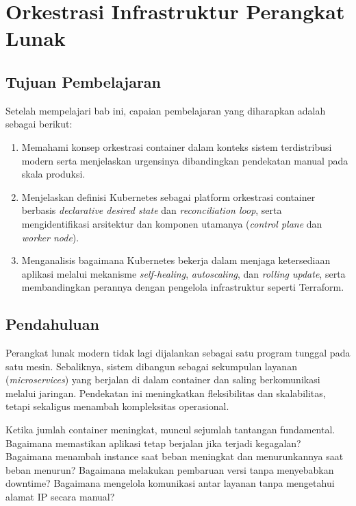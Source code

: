 \chapter{Orkestrasi Infrastruktur Perangkat Lunak}

\section*{Tujuan Pembelajaran}

Setelah mempelajari bab ini, capaian pembelajaran yang diharapkan adalah sebagai berikut:

\begin{enumerate}
    \item Memahami konsep orkestrasi container dalam konteks sistem terdistribusi modern serta menjelaskan urgensinya dibandingkan pendekatan manual pada skala produksi.

    \item Menjelaskan definisi Kubernetes sebagai platform orkestrasi container berbasis \textit{declarative desired state} dan \textit{reconciliation loop}, serta mengidentifikasi arsitektur dan komponen utamanya (\textit{control plane} dan \textit{worker node}).

    \item Menganalisis bagaimana Kubernetes bekerja dalam menjaga ketersediaan aplikasi melalui mekanisme \textit{self-healing}, \textit{autoscaling}, dan \textit{rolling update}, serta membandingkan perannya dengan pengelola infrastruktur seperti Terraform.
\end{enumerate}
\section{Pendahuluan}

Perangkat lunak modern tidak lagi dijalankan sebagai satu program tunggal pada satu mesin. 
Sebaliknya, sistem dibangun sebagai sekumpulan layanan (\textit{microservices}) yang berjalan di dalam container dan saling berkomunikasi melalui jaringan. 
Pendekatan ini meningkatkan fleksibilitas dan skalabilitas, tetapi sekaligus menambah kompleksitas operasional.

Ketika jumlah container meningkat, muncul sejumlah tantangan fundamental. 
Bagaimana memastikan aplikasi tetap berjalan jika terjadi kegagalan? 
Bagaimana menambah instance saat beban meningkat dan menurunkannya saat beban menurun? 
Bagaimana melakukan pembaruan versi tanpa menyebabkan downtime? 
Bagaimana mengelola komunikasi antar layanan tanpa mengetahui alamat IP secara manual?

